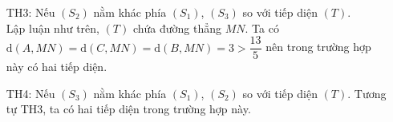 \begin{ex}
{\begin{enumerate}
		\\ Vì $\mathrm{d}(B,(T)) = \mathrm{d}(A,(T))$ và $A$, $B$ nằm khác phía so với $(T)$ nên $(T)$ đi qua trung điểm $M$ của $AB$. Tương tự $(T)$ cũng đi qua trung điểm $P$ của $AC$.
		\\ Tuy nhiên, $2,4 = \mathrm{d}(A,MP) \geq \mathrm{d}(A,(T)) = \dfrac{13}{5}$ (vô lí). Do đó trường hợp này không xảy ra.
		\item[TH3:] Nếu $(S_2)$ nằm khác phía $(S_1)$, $(S_3)$ so với tiếp diện $(T)$.
		\\ Lập luận như trên, $(T)$ chứa đường thẳng $MN$. Ta có $\mathrm{d}(A,MN) = \mathrm{d}(C,MN) = \mathrm{d}(B,MN) =3 >\dfrac{13}{5}$ nên trong trường hợp này có hai tiếp diện.
		\item[TH4:]  Nếu $(S_3)$ nằm khác phía $(S_1)$, $(S_2)$ so với tiếp diện $(T)$. Tương tự TH3, ta có hai tiếp diện trong trường hợp này.
	\end{enumerate}
}
\end{ex}

